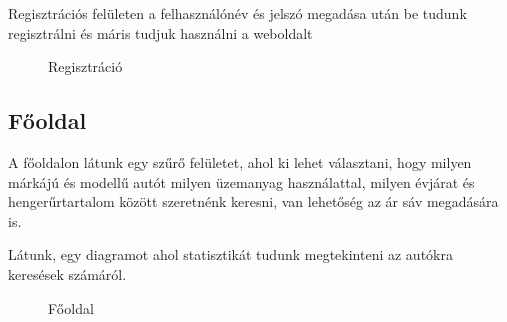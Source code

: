 Regisztrációs felületen a felhasználónév és jelszó megadása után be tudunk regisztrálni és máris tudjuk használni a weboldalt

\begin{figure}[h]
\centering
{}
\caption{Regisztráció}
\label{fig:Regisztráció}
\end{figure}

\newpage
\subsection{Főoldal}

A főoldalon látunk egy szűrő felületet, ahol ki lehet választani, hogy milyen márkájú és modellű autót milyen üzemanyag használattal, milyen évjárat és hengerűrtartalom között szeretnénk keresni, van lehetőség az ár sáv megadására is.

Látunk, egy diagramot ahol statisztikát tudunk megtekinteni az autókra keresések számáról.

\begin{figure}[h]
\centering
{}
\caption{Főoldal}
\label{fig:Fooldal}
\end{figure}

